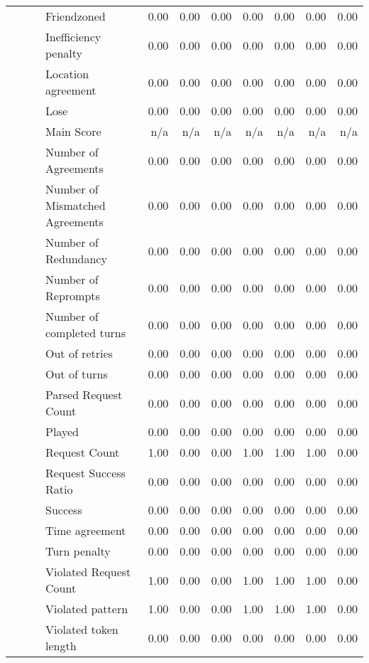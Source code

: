 \begin{tabular}{llllrrrrrrr}
 &  &  & Friendzoned & 0.00 & 0.00 & 0.00 & 0.00 & 0.00 & 0.00 & 0.00 \\
 &  &  & Inefficiency penalty & 0.00 & 0.00 & 0.00 & 0.00 & 0.00 & 0.00 & 0.00 \\
 &  &  & Location agreement & 0.00 & 0.00 & 0.00 & 0.00 & 0.00 & 0.00 & 0.00 \\
 &  &  & Lose & 0.00 & 0.00 & 0.00 & 0.00 & 0.00 & 0.00 & 0.00 \\
 &  &  & Main Score & n/a & n/a & n/a & n/a & n/a & n/a & n/a \\
 &  &  & Number of Agreements & 0.00 & 0.00 & 0.00 & 0.00 & 0.00 & 0.00 & 0.00 \\
 &  &  & Number of Mismatched Agreements & 0.00 & 0.00 & 0.00 & 0.00 & 0.00 & 0.00 & 0.00 \\
 &  &  & Number of Redundancy & 0.00 & 0.00 & 0.00 & 0.00 & 0.00 & 0.00 & 0.00 \\
 &  &  & Number of Reprompts & 0.00 & 0.00 & 0.00 & 0.00 & 0.00 & 0.00 & 0.00 \\
 &  &  & Number of completed turns & 0.00 & 0.00 & 0.00 & 0.00 & 0.00 & 0.00 & 0.00 \\
 &  &  & Out of retries & 0.00 & 0.00 & 0.00 & 0.00 & 0.00 & 0.00 & 0.00 \\
 &  &  & Out of turns & 0.00 & 0.00 & 0.00 & 0.00 & 0.00 & 0.00 & 0.00 \\
 &  &  & Parsed Request Count & 0.00 & 0.00 & 0.00 & 0.00 & 0.00 & 0.00 & 0.00 \\
 &  &  & Played & 0.00 & 0.00 & 0.00 & 0.00 & 0.00 & 0.00 & 0.00 \\
 &  &  & Request Count & 1.00 & 0.00 & 0.00 & 1.00 & 1.00 & 1.00 & 0.00 \\
 &  &  & Request Success Ratio & 0.00 & 0.00 & 0.00 & 0.00 & 0.00 & 0.00 & 0.00 \\
 &  &  & Success & 0.00 & 0.00 & 0.00 & 0.00 & 0.00 & 0.00 & 0.00 \\
 &  &  & Time agreement & 0.00 & 0.00 & 0.00 & 0.00 & 0.00 & 0.00 & 0.00 \\
 &  &  & Turn penalty & 0.00 & 0.00 & 0.00 & 0.00 & 0.00 & 0.00 & 0.00 \\
 &  &  & Violated Request Count & 1.00 & 0.00 & 0.00 & 1.00 & 1.00 & 1.00 & 0.00 \\
 &  &  & Violated pattern & 1.00 & 0.00 & 0.00 & 1.00 & 1.00 & 1.00 & 0.00 \\
 &  &  & Violated token length & 0.00 & 0.00 & 0.00 & 0.00 & 0.00 & 0.00 & 0.00 \\
\cline{3-11}

\end{tabular}
